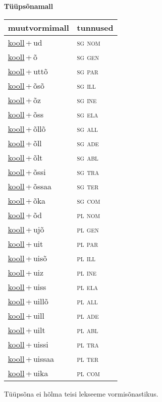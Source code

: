 
\vspace{1.8em}
\begin{minipage}{\textwidth}
\textbf{Tüüpsõnamall \,}\\

\begin{sideways}
\begin{tabular}{l l}
muutvormimall & tunnused \\
\hline
\underline{kooll}\,+\,ud & \textsc{ sg nom } \\
\underline{kooll}\,+\,õ & \textsc{ sg gen } \\
\underline{kooll}\,+\,uttõ & \textsc{ sg par } \\
\underline{kooll}\,+\,õsõ & \textsc{ sg ill } \\
\underline{kooll}\,+\,õz & \textsc{ sg ine } \\
\underline{kooll}\,+\,õss & \textsc{ sg ela } \\
\underline{kooll}\,+\,õllõ & \textsc{ sg all } \\
\underline{kooll}\,+\,õll & \textsc{ sg ade } \\
\underline{kooll}\,+\,õlt & \textsc{ sg abl } \\
\underline{kooll}\,+\,õssi & \textsc{ sg tra } \\
\underline{kooll}\,+\,õssaa & \textsc{ sg ter } \\
\underline{kooll}\,+\,õka & \textsc{ sg com } \\
\underline{kooll}\,+\,õd & \textsc{ pl nom } \\
\underline{kooll}\,+\,ujõ & \textsc{ pl gen } \\
\underline{kooll}\,+\,uit & \textsc{ pl par } \\
\underline{kooll}\,+\,uisõ & \textsc{ pl ill } \\
\underline{kooll}\,+\,uiz & \textsc{ pl ine } \\
\underline{kooll}\,+\,uiss & \textsc{ pl ela } \\
\underline{kooll}\,+\,uillõ & \textsc{ pl all } \\
\underline{kooll}\,+\,uill & \textsc{ pl ade } \\
\underline{kooll}\,+\,uilt & \textsc{ pl abl } \\
\underline{kooll}\,+\,uissi & \textsc{ pl tra } \\
\underline{kooll}\,+\,uissaa & \textsc{ pl ter } \\
\underline{kooll}\,+\,uika & \textsc{ pl com } \\
\end{tabular}
\end{sideways}
\label{tab:tüüpsõnamall-koollud}

\end{minipage}

 
\vspace{1em}
\noindent Tüüpsõna ei hõlma teisi lekseeme vormi\-sõnastikus.
